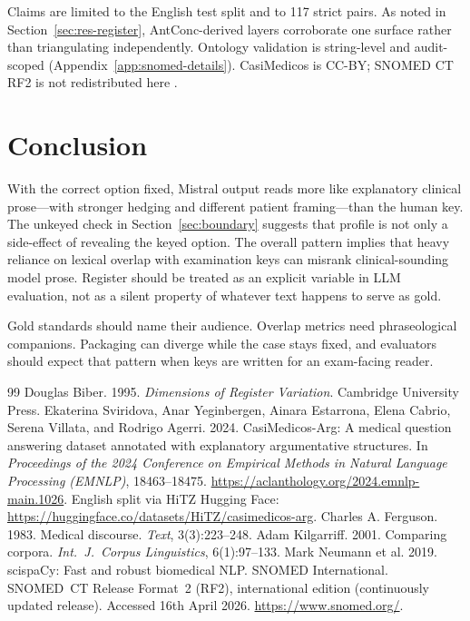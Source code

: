 \documentclass[11pt,a4paper]{article}
\begin{document}
Claims are limited to the English test split and to 117 strict pairs. As noted in Section~\ref{sec:res-register}, AntConc-derived layers corroborate one surface rather than triangulating independently. Ontology validation is string-level and audit-scoped (Appendix~\ref{app:snomed-details}). CasiMedicos is CC-BY; SNOMED CT RF2 is not redistributed here \cite{snomed2026}.

\section{Conclusion}

With the correct option fixed, Mistral output reads more like explanatory clinical prose---with stronger hedging and different patient framing---than the human key. The unkeyed check in Section~\ref{sec:boundary} suggests that profile is not only a side-effect of revealing the keyed option. The overall pattern implies that heavy reliance on lexical overlap with examination keys can misrank clinical-sounding model prose. Register should be treated as an explicit variable in LLM evaluation, not as a silent property of whatever text happens to serve as gold.

\noindent Gold standards should name their audience. Overlap metrics need phraseological companions. Packaging can diverge while the case stays fixed, and evaluators should expect that pattern when keys are written for an exam-facing reader.

\FloatBarrier
{}
{}
\begin{thebibliography}{99}
\footnotesize
\setlength\itemsep{1pt}
\setlength\parskip{0pt}
 Douglas Biber. 1995. \emph{Dimensions of Register Variation}. Cambridge University Press.
 Ekaterina Sviridova, Anar Yeginbergen, Ainara Estarrona, Elena Cabrio, Serena Villata, and Rodrigo Agerri. 2024. CasiMedicos-Arg: A medical question answering dataset annotated with explanatory argumentative structures. In \emph{Proceedings of the 2024 Conference on Empirical Methods in Natural Language Processing (EMNLP)}, 18463--18475. \url{https://aclanthology.org/2024.emnlp-main.1026}. English split via HiTZ Hugging Face: \url{https://huggingface.co/datasets/HiTZ/casimedicos-arg}.
 Charles A. Ferguson. 1983. Medical discourse. \emph{Text}, 3(3):223--248.
 Adam Kilgarriff. 2001. Comparing corpora. \emph{Int.\ J.\ Corpus Linguistics}, 6(1):97--133.
 Mark Neumann et al. 2019. scispaCy: Fast and robust biomedical NLP.
 SNOMED International. SNOMED~CT Release Format~2 (RF2), international edition (continuously updated release). Accessed 16th April 2026. \url{https://www.snomed.org/}.
\end{thebibliography}
\end{document}
